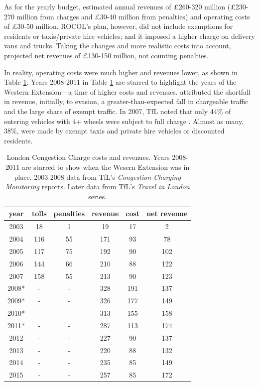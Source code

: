 As for the yearly budget, \citet{ROCOL2000} estimated annual revenues of \pounds 260-320 million (\pounds 230-270 million from charges and \pounds 30-40 million from penalties) and operating costs of \pounds 30-50 million. ROCOL's plan, however, did not include exemptions for residents or taxis/private hire vehicles; and it imposed a higher charge on delivery vans and trucks. Taking the changes and more realistic costs into account, \citet{TfL2002} projected net revenues of \pounds 130-150 million, not counting penalties.

In reality, operating costs were much higher and revenues lower, as shown in Table \ref{tab:London-Congestion-Charge}. Years 2008-2011 in Table \ref{tab:London-Congestion-Charge} are starred to highlight the years of the Western Extension---a time of higher costs and revenues. \citet[p. 186]{TfL2003b} attributed the shortfall in revenue, initially, to evasion, a greater-than-expected fall in chargeable traffic and the large share of exempt traffic. In 2007, TfL noted that only 44\% of entering vehicles with 4+ wheels were subject to full charge \citep[p. 12]{TfLExPost2007}. Almost as many, 38\%, were made by exempt taxis and private hire vehicles or discounted residents. 

\begin{table}[ht]
    \begin{tabular}{|c|c|c|c|c|c|}
        \hline 
        year & tolls & penalties & revenue & cost & net revenue\tabularnewline
        \hline 
        \hline 
        2003 & 18 & 1 & 19 & 17 & 2\tabularnewline
        \hline 
        2004 & 116 & 55 & 171 & 93 & 78\tabularnewline
        \hline 
        2005 & 117 & 75 & 192 & 90 & 102\tabularnewline
        \hline 
        2006 & 144 & 66 & 210 & 88 & 122\tabularnewline
        \hline 
        2007 & 158 & 55 & 213 & 90 & 123\tabularnewline
        \hline 
        2008{*} & - & - & 328 & 191 & 137\tabularnewline
        \hline 
        2009{*} & - & - & 326 & 177 & 149\tabularnewline
        \hline 
        2010{*} & - & - & 313 & 155 & 158\tabularnewline
        \hline 
        2011{*} & - & - & 287 & 113 & 174\tabularnewline
        \hline 
        2012 & - & - & 227 & 90 & 137\tabularnewline
        \hline 
        2013 & - & - & 220 & 88 & 132\tabularnewline
        \hline 
        2014 & - & - & 235 & 85 & 149\tabularnewline
        \hline 
        2015 & - & - & 257 & 85 & 172\tabularnewline
        \hline 
    \end{tabular}
    
    \caption{London Congestion Charge costs and revenues. Years 2008-2011 are starred to show when the Wesern Extension was in place. 2003-2008 data from TfL's \emph{Congestion Charging Monitoring} reports. Later data from TfL's \emph{Travel in London} series. }\label{tab:London-Congestion-Charge}
\end{table}